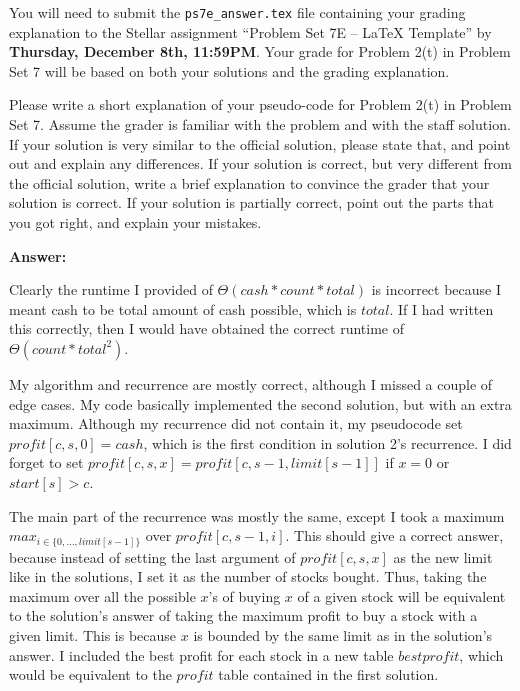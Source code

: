 \documentclass[12pt,twoside]{article}
\newcommand{\theproblemsetnum}{7E}
\newcommand{\releasedate}{December 7, 2011}
\begin{document}
\handout{Problem Set \theproblemsetnum}{\releasedate}
You will need to submit the \verb|ps7e_answer.tex| file containing your grading
explanation to the Stellar assignment ``Problem Set 7E -- LaTeX Template'' by
\textbf{Thursday, December 8th, 11:59PM}. Your grade for Problem 2(t) in
Problem Set 7 will be based on both your solutions and the grading explanation.
\medskip

\hrulefill

\begin{problems}

\problem Please write a short explanation of your pseudo-code for Problem 2(t)
in Problem Set 7. Assume the grader is familiar with the problem and with the
staff solution. If your solution is very similar to the official solution,
please state that, and point out and explain any differences. If your solution
is correct, but very different from the official solution, write a brief
explanation to convince the grader that your solution is correct. If your
solution is partially correct, point out the parts that you got right, and
explain your mistakes.

\textbf{Answer:}

Clearly the runtime I provided of $\Theta(cash * count * total)$ is incorrect because I meant cash to be total amount of cash possible, which is $total$. If I had written this correctly, then I would have obtained the correct runtime of $\Theta(count * total^2)$. 

My algorithm and recurrence are mostly correct, although I missed a couple of edge cases. My code basically implemented the second solution, but with an extra maximum. Although my recurrence did not contain it, my pseudocode set $profit[c,s,0] = cash$, which is the first condition in solution 2's recurrence. I did forget to set $profit[c,s,x] = profit[c,s-1, limit[s-1]]$ if $x = 0$ or $start[s] > c$. 

The main part of the recurrence was mostly the same, except I took a maximum $max_{i \in \{0, \ldots, limit[s-1] \} }$ over $profit[c,s-1,i]$. This should give a correct answer, because instead of setting the last argument of $profit[c,s,x]$ as the new limit like in the solutions, I set it as the number of stocks bought. Thus, taking the maximum over all the possible $x$'s of buying $x$ of a given stock will be equivalent to the solution's answer of taking the maximum profit to buy a stock with a given limit. This is because $x$ is bounded by the same limit as in the solution's answer. I included the best profit for each stock in a new table $bestprofit$, which would be equivalent to the $profit$ table contained in the first solution.

\end{problems}
\end{document}
